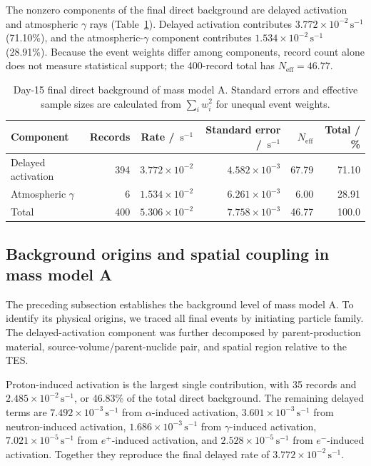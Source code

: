 \documentclass[11pt]{article}
\newcommand{\cps}{\ensuremath{\,\mathrm{s^{-1}}}}
\begin{document}
The nonzero components of the final direct background are delayed activation
and atmospheric $\gamma$ rays
(Table~\ref{tab:reference_background_budget}). Delayed activation contributes
$3.772\times10^{-2}\cps$ (71.10\%), and the atmospheric-$\gamma$ component contributes
$1.534\times10^{-2}\cps$ (28.91\%). Because the event weights differ among
components, record count alone does not measure statistical support; the
400-record total has $N_{\mathrm{eff}}=46.77$.

\begin{table}[H]
\centering
\caption{Day-15 final direct background of mass model A. Standard errors and effective sample sizes are calculated from $\sum_i w_i^2$ for unequal event weights.}
\label{tab:reference_background_budget}
\footnotesize
\begin{tabular}{lrrrrr}
\toprule
Component & Records & Rate / $\cps$ & Standard error / $\cps$ & $N_{\mathrm{eff}}$ & Total / \% \\
\midrule
Delayed activation & 394 & $3.772\times10^{-2}$ & $4.582\times10^{-3}$ & 67.79 & 71.10 \\
Atmospheric $\gamma$ & 6 & $1.534\times10^{-2}$ & $6.261\times10^{-3}$ & 6.00 & 28.91 \\
\midrule
Total & 400 & $5.306\times10^{-2}$ & $7.758\times10^{-3}$ & 46.77 & 100.0 \\
\bottomrule
\end{tabular}
\end{table}

\subsection{Background origins and spatial coupling in mass model A}
\label{subsec:mass_model_a_origins}



\begingroup

The preceding subsection establishes the background level of mass model A. To identify its physical origins, we traced all final events by initiating particle family. The delayed-activation component was further decomposed by parent-production material, source-volume/parent-nuclide pair, and spatial region relative to the TES.

Proton-induced activation is the largest single contribution, with 35 records and $2.485\times10^{-2}\cps$, or 46.83\% of the total direct background. The remaining delayed terms are $7.492\times10^{-3}\cps$ from $\alpha$-induced activation, $3.601\times10^{-3}\cps$ from neutron-induced activation, $1.686\times10^{-3}\cps$ from $\gamma$-induced activation, $7.021\times10^{-5}\cps$ from $e^+$-induced activation, and $2.528\times10^{-5}\cps$ from $e^-$-induced activation. Together they reproduce the final delayed rate of $3.772\times10^{-2}\cps$.
\end{document}
